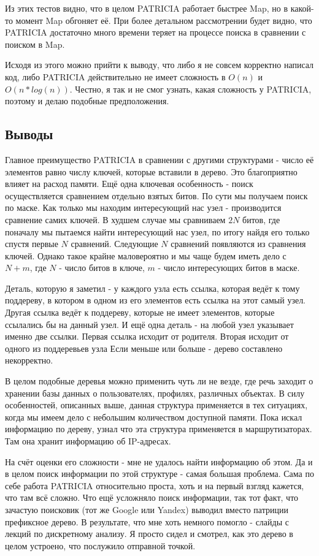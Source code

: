 \documentclass[12pt]{article}
\begin{document}
Из этих тестов видно, что в целом PATRICIA работает быстрее Map, но в какой-то момент Map обгоняет её. При более детальном рассмотрении будет видно, что PATRICIA достаточно много времени теряет на процессе поиска в сравнении с поиском в Map.

Исходя из этого можно прийти к выводу, что либо я не совсем корректно написал код, либо PATRICIA действительно не имеет сложность в $O(n)$ и $O(n*log(n))$. Честно, я так и не смог узнать, какая сложность у PATRICIA, поэтому и делаю подобные предположения.

\subsection*{Выводы}

Главное преимущество PATRICIA в сравнении с другими структурами - число её элементов равно числу ключей, которые вставили в дерево. Это благоприятно влияет на расход памяти. Ещё одна ключевая особенность - поиск осуществляется сравнением отдельно взятых битов. По сути мы получаем поиск по маске. Как только мы находим интересующий нас узел - производится сравнение самих ключей. В худшем случае мы сравниваем $2N$ битов, где поначалу мы пытаемся найти интересующий нас узел, по итогу найдя его только спустя первые $N$ сравнений. Следующие $N$ сравнений появляются из сравнения ключей. Однако такое крайне маловероятно и мы чаще будем иметь дело с $N + m$, где $N$ - число битов в ключе, $m$ - число интересующих битов в маске. 

Деталь, которую я заметил - у каждого узла есть ссылка, которая ведёт к тому поддереву, в котором в одном из его элементов есть ссылка на этот самый узел. Другая ссылка ведёт к поддереву, которые не имеет элементов, которые ссылались бы на данный узел. И ещё одна деталь - на любой узел указывает именно две ссылки. Первая ссылка исходит от родителя. Вторая исходит от одного из поддеревьев узла Если меньше или больше - дерево составлено некорректно.

В целом подобные деревья можно применить чуть ли не везде, где речь заходит о хранении базы данных о пользователях, профилях, различных объектах. В силу особенностей, описанных выше, данная структура применяется в тех ситуациях, когда мы имеем дело с небольшим количеством доступной памяти. Пока искал информацию по дереву, узнал что эта структура применяется в маршрутизаторах. Там она хранит информацию об IP-адресах.

На счёт оценки его сложности - мне не удалось найти информацию об этом. Да и в целом поиск информации по этой структуре - самая большая проблема. Сама по себе работа PATRICIA относительно проста, хоть и на первый взгляд кажется, что там всё сложно. Что ещё усложняло поиск информации, так тот факт, что зачастую поисковик (тот же Google или Yandex) выводил вместо патриции префиксное дерево. В результате, что мне хоть немного помогло - слайды с лекций по дискретному анализу. Я просто сидел и смотрел, как это дерево в целом устроено, что послужило отправной точкой.
\end{document}
